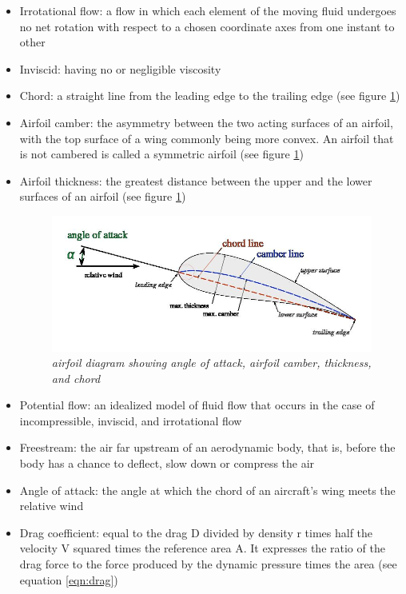 \documentclass{journal}
\begin{document}
	\begin{itemize}
		\item Irrotational flow: a flow in which each element of the moving fluid undergoes no net rotation with respect to a chosen coordinate axes from one instant to other
		\item Inviscid: having no or negligible viscosity
		\item Chord: a straight line from the leading edge to the trailing edge (see figure \ref{fig:airfoil-diagram})
		\item Airfoil camber: the asymmetry between the two acting surfaces of an airfoil, with the top surface of a wing commonly being more convex. An airfoil that is not cambered is called a symmetric airfoil (see figure \ref{fig:airfoil-diagram})
		\item Airfoil thickness: the greatest distance between the upper and the lower surfaces of an airfoil (see figure \ref{fig:airfoil-diagram})
		
		\begin{figure}
			\centering
			\includegraphics[scale=0.4]{../graphics/airfoil-diagram.jpg}
			\caption{\emph{airfoil diagram showing angle of attack, airfoil camber, thickness, and chord}}
			\label{fig:airfoil-diagram}
		\end{figure}
		
		\item Potential flow: an idealized model of fluid flow that occurs in the case of incompressible, inviscid, and irrotational flow
		\item Freestream: the air far upstream of an aerodynamic body, that is, before the body has a chance to deflect, slow down or compress the air
		\item Angle of attack: the angle at which the chord of an aircraft's wing meets the relative wind
		\item Drag coefficient: equal to the drag D divided by density r times half the velocity V squared times the reference area A. It expresses the ratio of the drag force to the force produced by the dynamic pressure times the area (see equation \ref{eqn:drag})
		

\end{itemize}
\end{document}
